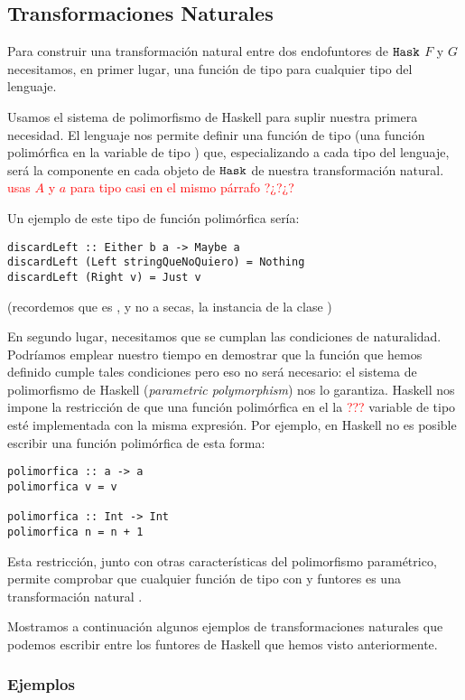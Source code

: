 \subsection{Transformaciones Naturales}
Para construir una transformación natural entre dos endofuntores de
$\texttt{Hask}$ $F$ y $G$ necesitamos, en primer lugar, una función de tipo
 para  cualquier tipo del lenguaje.

Usamos el sistema de polimorfismo de Haskell para suplir nuestra primera
necesidad. El lenguaje nos permite definir una función de
tipo  (una función polimórfica en la variable de
tipo ) que, especializando a cada tipo del lenguaje, será
la componente en cada objeto de $\texttt{Hask}$ de nuestra transformación natural. \textcolor{red}{usas $A$ y $a$ para tipo casi en el mismo párrafo ?¿?¿?}

Un ejemplo de este tipo de función polimórfica sería:
\begin{verbatim}
discardLeft :: Either b a -> Maybe a
discardLeft (Left stringQueNoQuiero) = Nothing
discardLeft (Right v) = Just v
\end{verbatim}
(recordemos que es , y no  a secas,
la instancia de la clase )

En segundo lugar, necesitamos que se cumplan las condiciones de
naturalidad. Podríamos emplear nuestro tiempo en demostrar que
la función  que hemos definido cumple
tales condiciones pero eso no
será necesario: el sistema de polimorfismo de
Haskell (\textit{parametric polymorphism}) nos lo garantiza.
Haskell nos impone la restricción de que
una función polimórfica en el la \textcolor{red}{???} variable de tipo 
esté implementada
con la misma expresión. Por ejemplo, en Haskell no es posible
escribir una función polimórfica de esta forma:
\begin{verbatim}
polimorfica :: a -> a
polimorfica v = v

polimorfica :: Int -> Int
polimorfica n = n + 1
\end{verbatim}
Esta restricción, junto con otras características
del polimorfismo paramétrico, permite comprobar que cualquier
función de tipo  con  y  funtores es
una transformación natural \cite{theorems-for-free}.

Mostramos a continuación algunos ejemplos de transformaciones naturales
que podemos escribir entre los funtores de Haskell que hemos visto
anteriormente.

\subsubsection{Ejemplos}
